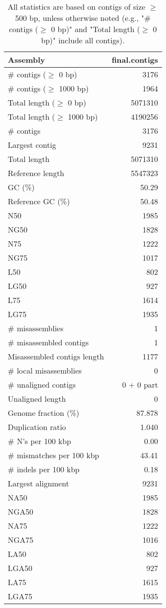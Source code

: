 \documentclass[12pt,a4paper]{article}
\begin{document}
\begin{table}[ht]
\begin{center}
\caption{All statistics are based on contigs of size $\geq$ 500 bp, unless otherwise noted (e.g., "\# contigs ($\geq$ 0 bp)" and "Total length ($\geq$ 0 bp)" include all contigs).}
\begin{tabular}{|l*{1}{|r}|}
\hline
Assembly & final.contigs \\ \hline
\# contigs ($\geq$ 0 bp) & 3176 \\ \hline
\# contigs ($\geq$ 1000 bp) & 1964 \\ \hline
Total length ($\geq$ 0 bp) & 5071310 \\ \hline
Total length ($\geq$ 1000 bp) & 4190256 \\ \hline
\# contigs & 3176 \\ \hline
Largest contig & 9231 \\ \hline
Total length & 5071310 \\ \hline
Reference length & 5547323 \\ \hline
GC (\%) & 50.29 \\ \hline
Reference GC (\%) & 50.48 \\ \hline
N50 & 1985 \\ \hline
NG50 & 1828 \\ \hline
N75 & 1222 \\ \hline
NG75 & 1017 \\ \hline
L50 & 802 \\ \hline
LG50 & 927 \\ \hline
L75 & 1614 \\ \hline
LG75 & 1935 \\ \hline
\# misassemblies & 1 \\ \hline
\# misassembled contigs & 1 \\ \hline
Misassembled contigs length & 1177 \\ \hline
\# local misassemblies & 0 \\ \hline
\# unaligned contigs & 0 + 0 part \\ \hline
Unaligned length & 0 \\ \hline
Genome fraction (\%) & 87.878 \\ \hline
Duplication ratio & 1.040 \\ \hline
\# N's per 100 kbp & 0.00 \\ \hline
\# mismatches per 100 kbp & 43.41 \\ \hline
\# indels per 100 kbp & 0.18 \\ \hline
Largest alignment & 9231 \\ \hline
NA50 & 1985 \\ \hline
NGA50 & 1828 \\ \hline
NA75 & 1222 \\ \hline
NGA75 & 1016 \\ \hline
LA50 & 802 \\ \hline
LGA50 & 927 \\ \hline
LA75 & 1615 \\ \hline
LGA75 & 1935 \\ \hline
\end{tabular}
\end{center}
\end{table}
\end{document}

